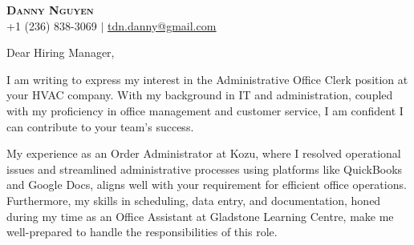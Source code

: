 \documentclass[letterpaper,11pt]{article}
\begin{document}
\begin{center}
\textbf{\Huge \scshape Danny Nguyen} \\ \vspace{1pt}
\small +1 (236) 838-3069 $|$ \href{mailto:tdn.danny@gmail.com}{\underline{tdn.danny@gmail.com}}
\end{center}

\vspace{20pt}

\vspace{20pt}

Dear Hiring Manager, \\
\vspace{10pt}

\vspace{10pt}
I am writing to express my interest in the Administrative Office Clerk position at your HVAC company. With my background in IT and administration, coupled with my proficiency in office management and customer service, I am confident I can contribute to your team's success.

\vspace{10pt}
My experience as an Order Administrator at Kozu, where I resolved operational issues and streamlined administrative processes using platforms like QuickBooks and Google Docs, aligns well with your requirement for efficient office operations. Furthermore, my skills in scheduling, data entry, and documentation, honed during my time as an Office Assistant at Gladstone Learning Centre, make me well-prepared to handle the responsibilities of this role.
\end{document}
